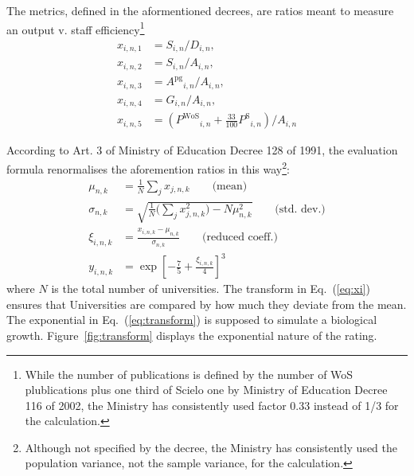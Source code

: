 \documentclass[twocolumn]{article}
\def\npup{\ensuremath{S}}
\def\nmaj{\ensuremath{D}}
\def\nprof{\ensuremath{A}}
\def\ngrad{\ensuremath{A^\text{pg}}}
\def\ngrant{\ensuremath{G}}
\def\nisi{\ensuremath{P^\text{WoS}}}
\def\nscielo{\ensuremath{P^\text{S}}}
\def\eqref#1{Eq.~(\ref{eq:#1})}
\begin{document}
The metrics, defined in the aformentioned decrees, are ratios meant to measure an output v. staff efficiency\footnote{While the number of publications is defined by the number of WoS plublications plus one third of Scielo one by Ministry of Education Decree 116 of 2002, the Ministry has consistently used factor 0.33 instead of 1/3 for the calculation.}
\begin{subequations}
\begin{align}
    x_{i,n,1} &= \npup_{i,n} / \nmaj_{i,n},  \label{eq:x1}             \\
    x_{i,n,2} &= \npup_{i,n} / \nprof_{i,n},                           \\ 
    x_{i,n,3} &= \ngrad_{i,n} / \nprof_{i,n},                          \\
    x_{i,n,4} &= \ngrant_{i,n} / \nprof_{i,n},                         \\
    x_{i,n,5} &= (\nisi_{i,n} + \frac{33}{100} \nscielo_{i,n}) / \nprof_{i,n}
\end{align}
\end{subequations}

According to Art. 3 of Ministry of Education Decree 128 of 1991,  the
evaluation formula renormalises the aforemention ratios in this
way\footnote{Although not specified by the decree, the Ministry has
consistently used the population variance, not the sample variance, for the calculation.}:
\begin{subequations}
\begin{align}
    \mu_{n,k}    &= \frac1N\sum_j x_{j,n,k}\qquad\text{(mean)} \label{eq:mu}\\
    \sigma_{n,k} &= \sqrt{\frac 1N \Big(\sum_j x_{j,n,k}^2\Big) - N\mu_{n,k}^2}\qquad\text{(std. dev.)} \label{eq:sigma}\\
    \xi_{i,n,k}  &= \frac{x_{i,n,k} - \mu_{n,k} }{\sigma_{n,k}} 
\qquad\text{(reduced coeff.)} \label{eq:xi}\\
    y_{i,n,k}    &= \exp \left[ -\frac 75 + \frac{\xi_{i,n,k}}4  \right]^3 \label{eq:transform}
\end{align}
\end{subequations}
where $N$ is the total number of universities.
The transform in \eqref{xi} ensures that Universities are compared by how much they deviate from the mean. The exponential in \eqref{transform} is supposed to simulate a biological growth. Figure~\ref{fig:transform} displays the exponential nature of the rating.
\end{document}
